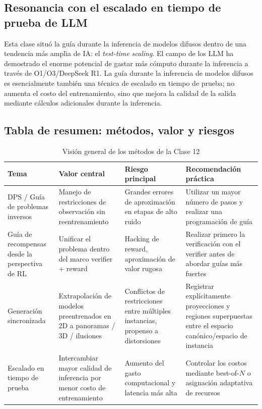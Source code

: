 \documentclass[a4paper]{article}
\begin{document}
\subsection{Resonancia con el escalado en tiempo de prueba de LLM}

Esta clase situó la guía durante la inferencia de modelos difusos dentro de una tendencia más amplia de IA: el \textit{test-time scaling}. El campo de los LLM ha demostrado el enorme potencial de gastar más cómputo durante la inferencia a través de O1/O3/DeepSeek R1. La guía durante la inferencia de modelos difusos es esencialmente también una técnica de escalado en tiempo de prueba; no aumenta el costo del entrenamiento, sino que mejora la calidad de la salida mediante cálculos adicionales durante la inferencia.

\subsection{Tabla de resumen: métodos, valor y riesgos}

\begin{table}[H]
\centering
\begin{tabular}{p{} p{} p{} p{}}
\toprule
Tema & Valor central & Riesgo principal & Recomendación práctica \\
\midrule
DPS / Guía de problemas inversos & Manejo de restricciones de observación sin reentrenamiento & Grandes errores de aproximación en etapas de alto ruido & Utilizar un mayor número de pasos y realizar una programación de guía \\
Guía de recompensas desde la perspectiva de RL & Unificar el problema dentro del marco verifier + reward & Hacking de reward, aproximación de valor rugosa & Realizar primero la verificación con el verifier antes de abordar guías más fuertes \\
Generación sincronizada & Extrapolación de modelos preentrenados en 2D a panoramas / 3D / ilusiones & Conflictos de restricciones entre múltiples instancias, propenso a distorsiones & Registrar explícitamente proyecciones y regiones superpuestas entre el espacio canónico/espacio de instancia \\
Escalado en tiempo de prueba & Intercambiar mayor calidad de inferencia por menor costo de entrenamiento & Aumento del gasto computacional y latencia más alta & Controlar los costos mediante best-of-$N$ o asignación adaptativa de recursos \\
\bottomrule
\end{tabular}
\caption{Visión general de los métodos de la Clase 12}
\end{table}
\end{document}
